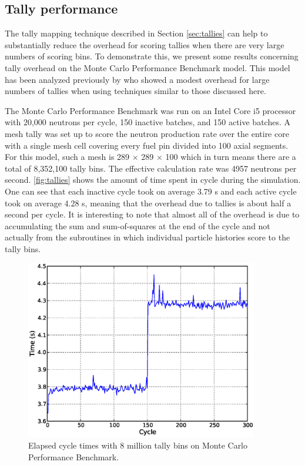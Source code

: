 \documentclass[authoryear,preprint]{elsarticle}
\begin{document}
\subsection{Tally performance}

The tally mapping technique described in Section \ref{sec:tallies} can help to
substantially reduce the overhead for scoring tallies when there are very large
numbers of scoring bins. To demonstrate this, we present some results concerning
tally overhead on the Monte Carlo Performance Benchmark model. This model has
been analyzed previously by \citet{mc21-physor} who showed a modest overhead for
large numbers of tallies when using techniques similar to those discussed here.

The Monte Carlo Performance Benchmark was run on an Intel Core i5 processor with
20,000 neutrons per cycle, 150 inactive batches, and 150 active batches. A mesh
tally was set up to score the neutron production rate over the entire core with
a single mesh cell covering every fuel pin divided into 100 axial segments. For
this model, such a mesh is 289 $\times$ 289 $\times$ 100 which in turn means
there are a total of 8,352,100 tally bins. The effective calculation rate was
4957 neutrons per second. \autoref{fig:tallies} shows the amount of time spent
in cycle during the simulation. One can see that each inactive cycle took on
average 3.79 s and each active cycle took on average 4.28 s, meaning
that the overhead due to tallies is about half a second per cycle. It is
interesting to note that almost all of the overhead is due to accumulating the
sum and sum-of-squares at the end of the cycle and not actually from the
subroutines in which individual particle histories score to the tally bins.

\begin{figure}[!ht]
  \centering
  \includegraphics[width=4in]{tallies.eps}
  \caption{Elapsed cycle times with 8 million tally bins on Monte Carlo
    Performance Benchmark.}
  \label{fig:tallies}
\end{figure}
\end{document}
